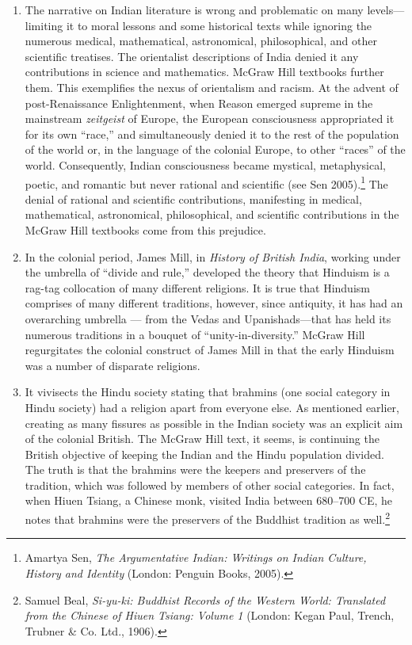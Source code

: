 \begin{enumerate}
\item The narrative on Indian literature is wrong and problematic on many levels—limiting it to moral lessons and some historical texts while ignoring the numerous medical, mathematical, astronomical, philosophical, and other scientific treatises. The orientalist descriptions of India denied it any contributions in science and mathematics. McGraw Hill textbooks further them. This exemplifies the nexus of orientalism and racism. At the advent of post-Renaissance Enlightenment, when Reason emerged supreme in the mainstream \textit{zeitgeist} of Europe, the European consciousness appropriated it for its own “race,” and simultaneously denied it to the rest of the population of the world or, in the language of the colonial Europe, to other “races” of the world. Consequently, Indian consciousness became mystical, metaphysical, poetic, and romantic but never rational and scientific (see Sen 2005).\footnote{Amartya Sen, \textit{The Argumentative Indian: Writings on Indian Culture, History and Identity} (London: Penguin Books, 2005).} The denial of rational and scientific contributions, manifesting in medical, mathematical, astronomical, philosophical, and scientific contributions in the McGraw Hill textbooks come from this prejudice. 

\item In the colonial period, James Mill, in \textit{History of British India}, working under the umbrella of “divide and rule,” developed the theory that Hinduism is a rag-tag collocation of many different religions. It is true that Hinduism comprises of many different traditions, however, since antiquity, it has had an overarching umbrella — from the Vedas and Upanishads—that has held its numerous traditions in a bouquet of “unity-in-diversity.” McGraw Hill  regurgitates the colonial construct of James Mill in that the early Hinduism was a number of disparate religions.

\item It vivisects the Hindu society stating that brahmins (one social category in Hindu society) had a religion apart from everyone else. As mentioned earlier, creating as many fissures as possible in the Indian society was an explicit aim of the colonial British. The McGraw Hill text, it seems, is continuing the British objective of keeping the Indian and the Hindu population divided. The truth is that the brahmins were the keepers and preservers of the tradition, which was followed by members of other social categories. In fact, when Hiuen Tsiang, a Chinese monk, visited India between 680--700 CE, he notes that brahmins were the preservers of the Buddhist tradition as well.\footnote{Samuel Beal, \textit{Si-yu-ki: Buddhist Records of the Western World: Translated from the Chinese of Hiuen Tsiang: Volume 1} (London: Kegan Paul, Trench, Trubner \& Co. Ltd., 1906).} 


\end{enumerate}
